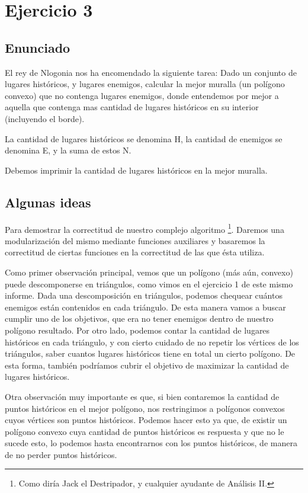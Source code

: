 \section{Ejercicio 3}




\subsection{Enunciado}

El rey de Nlogonia nos ha encomendado la siguiente tarea: Dado un conjunto de lugares históricos, y lugares enemigos, calcular la mejor muralla (un polígono convexo) que no contenga lugares enemigos, donde entendemos por mejor a aquella que contenga mas cantidad de lugares históricos en su interior (incluyendo el borde).

La cantidad de lugares históricos se denomina H, la cantidad de enemigos se denomina E, y la suma de estos N.

Debemos imprimir la cantidad de lugares históricos en la mejor muralla.

\subsection{Algunas ideas}
\par{Para demostrar la correctitud de nuestro complejo algoritmo \footnote{Como diría Jack el Destripador, y cualquier ayudante de Análisis II.}. Daremos una modularización del mismo mediante funciones auxiliares y basaremos la correctitud de ciertas funciones en la correctitud de las que ésta utiliza.} \newline
\par{Como primer observación principal, vemos que un polígono (más aún, convexo) puede descomponerse en triángulos, como vimos en el ejercicio 1 de este mismo informe. Dada una descomposición en triángulos, podemos chequear cuántos enemigos están contenidos en cada triángulo. De esta manera vamos a buscar cumplir uno de los objetivos, que era no tener enemigos dentro de nuestro polígono resultado. Por otro lado, podemos contar la cantidad de lugares históricos en cada triángulo, y con cierto cuidado de no repetir los vértices de los triángulos, saber cuantos lugares históricos tiene en total un cierto polígono. De esta forma, también podríamos cubrir el objetivo de maximizar la cantidad de lugares históricos.} \newline
\par{Otra observación muy importante es que, si bien contaremos la cantidad de puntos históricos en el mejor polígono, nos restringimos a polígonos convexos cuyos vértices son puntos históricos. Podemos hacer esto ya que, de existir un polígono convexo cuya cantidad de puntos históricos es respuesta y que no le sucede esto, lo podemos  hasta encontrarnos con los puntos históricos, de manera de no perder puntos históricos.} \newline

